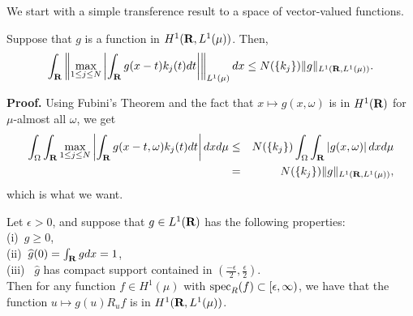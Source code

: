We start with a simple transference result to a 
space of vector-valued functions.
\begin{vector-version}
Suppose that $g$ is a 
function in $H^1(\R,L^1(\mu))$.  Then,
\begin{equation}
\int_\R \left\| \max_{1\leq j\leq N}
\left|
\int_\R
g(x-t) k_j(t) dt
\right|
\right\|_{L^1(\mu)}dx\leq
N(\{k_j\}) \|g\|_{L^1(\R,L^1(\mu))}.
\label{main-vector-inequality}
\end{equation}
\label{vector-version}
\end{vector-version}
{\bf Proof.}  Using Fubini's Theorem and the fact that $x\mapsto g(x,\omega)$
is in $H^1(\R)$ for $\mu$-almost all $\omega$, we get
\begin{eqnarray*}
\int_\O \int_\R \max_{1\leq j\leq N}
\left| \int_\R g(x-t,\omega) k_j(t)d t\right| d x d\mu
		&\leq&
N(\{k_j\}) \int_\O\int_\R \left| g(x,\omega)\right| d x d \mu\\
		&=& 
N(\{k_j\}) \|g\|_{L^1(\R,L^1(\mu))},
\end{eqnarray*}
which is what we want.
\begin{lemma-sec3}
Let $\epsilon >0$, and suppose that $g\in L^1(\R)$ has the following
properties:\\
(i)\  $g\geq 0$,\\
(ii)\ $\widehat{g}(0)=\int_\R g d x=1$,\\
(iii)  \ $\widehat{g}$ has compact support contained in 
$\left(\frac{-\epsilon}{2},\frac{\epsilon}{2}\right)$.\\
Then for any function $f\in H^1(\mu)$ with
${\rm spec}_R (f)\subset [\epsilon,\infty)$, we have that the
function $u\mapsto g(u) R_u f$ is in $H^1(\R, L^1(\mu))$.
\label{lemma-sec3}
\end{lemma-sec3}
